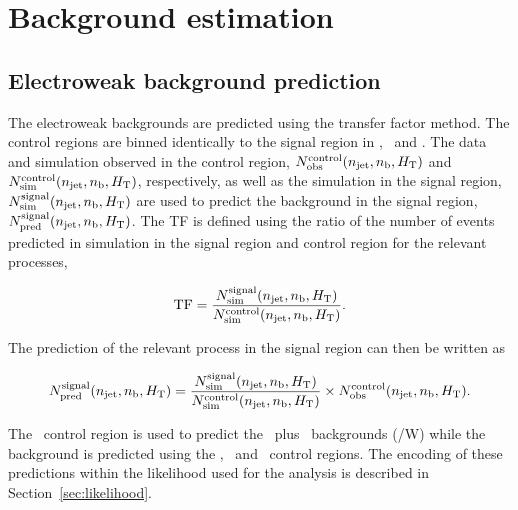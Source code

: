 \section{Background estimation}
\subsection{Electroweak background prediction}
\label{sec:tf-pred}
The electroweak backgrounds are predicted using the transfer factor
method. The control regions are binned identically
to the signal region in \scalht, \nj ~and \nb. The data and simulation observed in the control region,
$N_{\textrm{obs}}^{\rm control}(n_{\text{jet}},n_{\mathrm{b}},\mbox{$H_\text{T}$})$ and $N_{\textrm{sim}}^{\rm control}(n_{\text{jet}},n_{\mathrm{b}},\mbox{$H_\text{T}$})$, respectively, 
as well as the simulation in the signal region, $N_{\textrm{sim}}^{\rm signal}(n_{\text{jet}},n_{\mathrm{b}},\mbox{$H_\text{T}$})$ 
are used to predict the background in the signal region, $N_{\textrm{pred}}^{\rm signal}(n_{\text{jet}},n_{\mathrm{b}},\mbox{$H_\text{T}$})$. 
The TF is defined using the ratio of the number of events predicted in 
simulation in the signal region and control region for the relevant processes,

\begin{equation}
  \label{equ:tf-ratio}
  {\rm TF} = \frac{N_{\rm sim}^{\rm signal}(n_{\text{jet}},n_{\mathrm{b}},\mbox{$H_\text{T}$})}{N_{\rm
      sim}^{\rm control}(n_{\text{jet}},n_{\mathrm{b}},\mbox{$H_\text{T}$})}.
\end{equation}

The prediction of the relevant process in the signal region can then be written as

\begin{equation}
  \label{equ:pred-method}
  N_{\textrm{pred}}^{\rm signal}(n_{\text{jet}},n_{\mathrm{b}},\mbox{$H_\text{T}$}) = \frac{N_{\rm sim}^{\rm
      signal}(n_{\text{jet}},n_{\mathrm{b}},\mbox{$H_\text{T}$})}{N_{\rm sim}^{\rm
      control}(n_{\text{jet}},n_{\mathrm{b}},\mbox{$H_\text{T}$})} \times N_{\textrm{obs}}^{\rm
    control}(n_{\text{jet}},n_{\mathrm{b}},\mbox{$H_\text{T}$}).
\end{equation}

The \mj~control region is used to predict the \wj~plus \ttbar~backgrounds (\ttbar/W) while the
\znunu background is predicted using the \mj, \mmj~and \gj~control regions. The encoding
of these predictions within the likelihood used for the \alphat analysis is
described in Section~\ref{sec:likelihood}.
%

